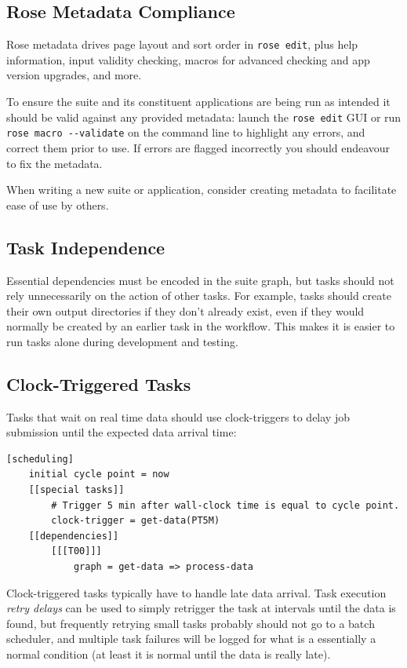 \subsection{Rose Metadata Compliance}
\label{Rose Metadata Compliance}
 
Rose metadata drives page layout and sort order in \lstinline=rose edit=, plus
help information, input validity checking, macros for advanced checking and app
version upgrades, and more.

To ensure the suite and its constituent applications are being run as intended
it should be valid against any provided metadata: launch the
\lstinline=rose edit= GUI or run \lstinline=rose macro --validate= on the
command line to highlight any errors, and correct them prior to use. If errors
are flagged incorrectly you should endeavour to fix the metadata.

When writing a new suite or application, consider creating metadata to
facilitate ease of use by others.

\subsection{Task Independence}

Essential dependencies must be encoded in the suite graph, but tasks should
not
rely unnecessarily on the action of other tasks. For example, tasks should
create their own output directories if they don't already exist, even if they
would normally be created by an earlier task in the workflow. This makes it is
easier to run tasks alone during development and testing.


\subsection{Clock-Triggered Tasks}
\label{Clock-Triggered Tasks}
Tasks that wait on real time data should use clock-triggers to delay job
submission until the expected data arrival time:

\lstset{language=suiterc}
\begin{lstlisting}
[scheduling]
    initial cycle point = now
    [[special tasks]]
        # Trigger 5 min after wall-clock time is equal to cycle point.
        clock-trigger = get-data(PT5M)
    [[dependencies]]
        [[[T00]]]
            graph = get-data => process-data
\end{lstlisting}

Clock-triggered tasks typically have to handle late data arrival. Task
execution {\em retry delays} can be used to simply retrigger the task at
intervals until the data is found, but frequently retrying small tasks probably
should not go to a batch scheduler, and multiple task failures will be logged
for what is a essentially a normal condition (at least it is normal until the
data is really late).

